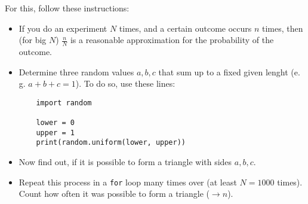 \documentclass[
	ngerman,
	fontsize=10pt,
	parskip=half,
	titlepage=true,
	DIV=12
]{scrartcl}
\newcommand*{\inPy}[1]{\texttt{#1}}
\newcommand*{\eg}{e.\,g. }
\begin{document}
For this, follow these instructions:
\begin{itemize}
\item If you do an experiment $N$ times, and a certain outcome occurs $n$ times, then (for big $N$) $\frac{n}{N}$ is a reasonable approximation for the probability of
	the outcome.
\item Determine three random values $a, b, c$ that sum up to a fixed given lenght (\eg $a+b+c=1$). To do so, use these lines:
	\begin{verbatim}
	import random
	
	lower = 0
	upper = 1
	print(random.uniform(lower, upper))
	\end{verbatim}
\item Now find out, if it is possible to form a triangle with sides $a, b, c$.
\item Repeat this process in a \inPy{for} loop many times over (at least $N=1000$ times). Count how often it was possible to form a triangle ($\rightarrow n$).
\end{itemize}
\end{document}
